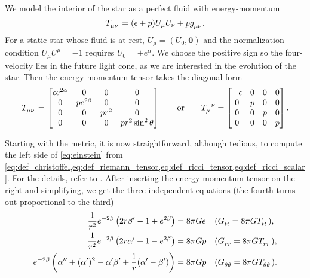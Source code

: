 \documentclass[a4paper,11pt,twoside]{report}
\begin{document}
We model the interior of the star as a perfect fluid with energy-momentum \cite[equation 1.114]{ref:carroll}
\begin{equation}
	T\indices{_\mu_\nu} = (\epsilon+p) U_\mu U_\nu + p g\indices{_\mu_\nu}.
\end{equation}
For a static star whose fluid is at rest, $U_\mu = (U_0, \textbf{0})$ and the normalization condition $U_\mu U^\mu = -1$ requires $U_0 = \pm e^\alpha$.
We choose the positive sign so the four-velocity lies in the future light cone, as we are interested in the evolution of the star.
Then the energy-momentum tensor takes the diagonal form
\begin{equation}
T\indices{_\mu_\nu} =
\begin{bmatrix}
	\epsilon e^{2\alpha} & 0            & 0     & 0                   \\
	0                    & p e^{2\beta} & 0     & 0                   \\
	0                    & 0            & p r^2 & 0                   \\
	0                    & 0            & 0     & p r^2 \sin^2 \theta \\
\end{bmatrix}
\qquad \text{or} \qquad
T\indices{_\mu^\nu} =
\begin{bmatrix}
	-\epsilon & 0 & 0 & 0 \\
	0         & p & 0 & 0 \\
	0         & 0 & p & 0 \\
	0         & 0 & 0 & p \\
\end{bmatrix}
.
\label{eq:einstein_to_tov:T}
\end{equation}

Starting with the metric, it is now straightforward, although tedious, to compute the left side of \cref{eq:einstein} from \cref{eq:def_christoffel,eq:def_riemann_tensor,eq:def_ricci_tensor,eq:def_ricci_scalar}.
For the details, refer to \cite[equation 5.11-5.15]{ref:carroll}.
After inserting the energy-momentum tensor on the right and simplifying, we get the three independent equations
(the fourth turns out proportional to the third)
\begin{subequations}
\begin{align}
	\frac{1}{r^2} e^{-2 \beta} \left( 2 r \beta' - 1 + e^{2 \beta} \right)  &= 8 \pi G \epsilon
	&& (G\indices{_t_t} = 8 \pi G T\indices{_t_t})                     , \label{eq:einstein_to_tov:tt} \\
	\frac{1}{r^2} e^{-2 \beta} \left( 2 r \alpha' + 1 - e^{2 \beta} \right) &= 8 \pi G p
	&& (G\indices{_r_r} = 8 \pi G T\indices{_r_r})                     , \label{eq:einstein_to_tov:rr} \\
	e^{-2 \beta} \left( \alpha'' + (\alpha')^2 - \alpha' \beta' + \frac{1}{r} (\alpha' - \beta') \right) &= 8 \pi G p
	&& (G\indices{_\theta_\theta} = 8 \pi G T\indices{_\theta_\theta}) . \label{eq:einstein_to_tov:thetatheta}
\end{align}
\end{subequations}
\end{document}
